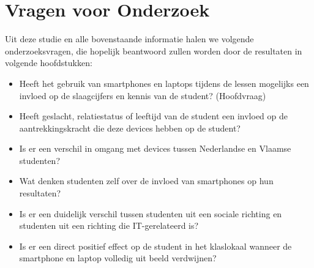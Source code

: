 \begin{landscape}
	\begin{table}[]
		\centering
		\caption{distributie examenresultaten Probleemoplossend Denken 1 academiejaar 2016-2017 \autocite{Amelynck2018}}
		\label{pod1ex}
	\end{table}
\end{landscape}

\section{Vragen voor Onderzoek}
\label{sec:eindliteratuur}

Uit deze studie en alle bovenstaande informatie halen we volgende onderzoeksvragen, die hopelijk beantwoord zullen worden door de resultaten in volgende hoofdstukken:

\begin{itemize}
	\item Heeft het gebruik van smartphones en laptops tijdens de lessen mogelijks een invloed op de slaagcijfers en kennis van de student? (Hoofdvraag)
	\item Heeft geslacht, relatiestatus of leeftijd van de student een invloed op de aantrekkingskracht die deze devices hebben op de student?
	\item Is er een verschil in omgang met devices tussen Nederlandse en Vlaamse studenten?
	\item Wat denken studenten zelf over de invloed van smartphones op hun resultaten?
	\item Is er een duidelijk verschil tussen studenten uit een sociale richting en studenten uit een richting die IT-gerelateerd is?
	\item Is er een direct positief effect op de student in het klaslokaal wanneer de smartphone en laptop volledig uit beeld verdwijnen?
\end{itemize}
